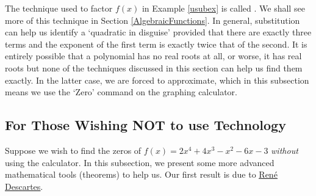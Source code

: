 The technique used to factor $f(x)$ in Example \ref{usubex} is called  .  We shall see more of this technique in Section \ref{AlgebraicFunctions}.  In general, substitution can help us identify a `quadratic in disguise' provided that there are exactly three terms and the exponent of the first term is exactly twice that of the second.  It is entirely possible that a polynomial has no real roots at all, or worse, it has real roots but none of the techniques discussed in this section can help us find them exactly.  In the latter case, we are forced to approximate, which in this subsection means we use the `Zero' command on the graphing calculator.  


\subsection{For Those Wishing NOT to use Technology}

Suppose we wish to find the zeros of $f(x) = 2x^4+4x^3-x^2-6x-3$ \textit{without} using the calculator.  In this subsection, we present some more advanced mathematical tools (theorems) to help us.  Our first result is due to \href{http://en.wikipedia.org/wiki/Descartes}{\underline{Ren\'{e} Descartes}}.

\smallskip


\smallskip

